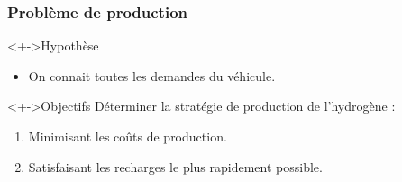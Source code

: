 \documentclass[hyperref={bookmarks=false},aspectratio=169]{beamer}
\begin{document}
\begin{frame}
\frametitle{Problème de production}%
	\begin{itemize}
	   
	    
	\end{itemize}
		\begin{block}<+->{Hypothèse}
		\begin{itemize}
 \item On connait toutes les demandes du véhicule. 
 \end{itemize}
\end{block}
	\begin{alertblock}<+->{Objectifs}
	Déterminer la stratégie de production de l'hydrogène : %
\begin{enumerate}
 
 \item Minimisant les coûts de production.
 \item Satisfaisant les recharges le plus rapidement possible.
 \end{enumerate}
 \end{alertblock}

	


	   


	



	


	\begin{columns}[t]


\end{columns}
\end{frame}
\end{document}
